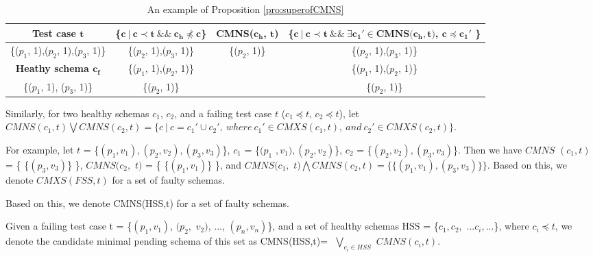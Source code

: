 \documentclass{sig-alternate-05-2015}
\begin{document}
{{%
\begin{table}[ht]
  \centering
  \setlength{\tabcolsep}{3pt}
  \caption{An example of Proposition \ref{pro:superofCMNS}}
    \begin{tabular}{|c|c|c|c|}
    \hline
  \textbf{  Test case $\textbf{t}$} & \textbf{ \{$\textbf{c}\ |\ \textbf{c} \prec \textbf{t}\ \&\&\ \textbf{c}_{\textbf{h}} \npreceq \textbf{c}$\} }& \textbf{ CMNS($\textbf{c}_{\textbf{h}}$, $\textbf{t}$)} & \textbf{\{$ \textbf{c}\ |\ \textbf{c} \prec \textbf{t} \ \&\& \ \exists \textbf{c}_{\textbf{1}}' \in \textbf{CMNS}\textbf{(}\textbf{c}_{\textbf{h}}, \textbf{t}\textbf{)}$, $\textbf{c} \preceq \textbf{c}_{\textbf{1}}'$ \}}\\\hline
    \{($p_{1}$, 1),($p_{2}$, 1),($p_{3}$, 1)\}  & \{($p_{2}$, 1),($p_{3}$, 1)\} & \{($p_{2}$, 1)\} & \{($p_{2}$, 1),($p_{3}$, 1)\}\\ \cline{1-1}
      \textbf{Heathy schema $\textbf{c}_{\textbf{f}}$}  & \{($p_{1}$, 1),($p_{2}$, 1)\} &  & \{($p_{1}$, 1),($p_{2}$, 1)\} \\\cline{1-1}
     \{($p_{1}$, 1), ($p_{3}$, 1)\}         &\{($p_{2}$, 1)\}  &  & \{($p_{2}$, 1)\}  \\ \hline
    \end{tabular}%
  \label{examleOfCMNSPro}%
\end{table}%


Similarly, for two healthy schemas $c_{1}$, $c_{2}$, and a failing test case $t$ ($c_{1} \preceq t$, $c_{2} \preceq t$), let $CMNS(c_{1}, t) \bigvee CMNS(c_{2}, t)  = \{ c\ |\ c = c_{1}' \cup c_{2}',\ where\ c_{1}' \in CMXS(c_{1}, t),\ and\ c_{2}' \in CMXS(c_{2}, t) \}$.

For example, let $t$ = \{$(p_{1},v_{1}), (p_{2}, v_{2}), (p_{3}, v_{3})$\}, $c_{1}$ = \{$(p_{1}$ $, v_{1}), (p_{2}, v_{2})$\}, $c_{2}$ = \{$(p_{2}, v_{2}), (p_{3}, v_{3})$\}. Then we have $CMNS$ $(c_{1}, t)$ = \{ \{$(p_{3}, v_{3})$\} \}, $CMNS(c_{2},$ $ t)$ = \{ \{$(p_{1}, v_{1})$\} \}, and  $CMNS(c_{1},$ $ t) \bigwedge CMNS(c_{2}, t) = \{ \{(p_{1}, v_{1}), (p_{3}, v_{3})\} \} $. Based on this, we denote $CMXS(FSS,t)$ for a set of faulty schemas.

Based on this, we denote CMNS(HSS,t) for a set of faulty schemas.


\begin{definition}
Given a failing test case t = \{$(p_{1}, v_{1})$, $(p_{2}, $ $v_{2})$, ..., $(p_{n}, v_{n})$\}, and a set of healthy schemas HSS = \{$c_{1} , c_{2},$ $  ...c_{i}, ...$\}, where $ c_{i} \preceq t$, we denote the candidate minimal pending schema of this set as CMNS(HSS,t)= $ $ $\bigvee_{c_{i}\in HSS}$ $ CMNS(c_{i}, t)$.
\end{definition}

}}
\end{document}
